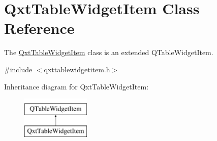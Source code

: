 \hypertarget{class_qxt_table_widget_item}{\section{Qxt\-Table\-Widget\-Item Class Reference}
\label{class_qxt_table_widget_item}
}


The \hyperlink{class_qxt_table_widget_item}{Qxt\-Table\-Widget\-Item} class is an extended Q\-Table\-Widget\-Item.  




{\ttfamily \#include $<$qxttablewidgetitem.\-h$>$}

Inheritance diagram for Qxt\-Table\-Widget\-Item\-:\begin{figure}[H]
\begin{center}
\leavevmode
\includegraphics[height=2.000000cm]{class_qxt_table_widget_item}
\end{center}
\end{figure}
